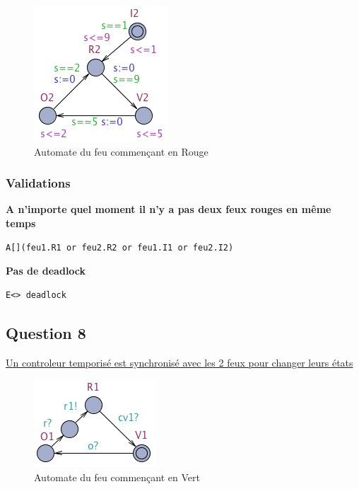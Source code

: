 \documentclass[11pt]{article}
\begin{document}
\begin{figure}[H]
	\centering
	\includegraphics{ressources/part2/Q7-2.png}
	\caption{Automate du feu commençant en Rouge}
\end{figure}

\subsubsection{Validations}

\textbf{A n'importe quel moment il n'y a pas deux feux rouges en même temps}
\begin{verbatim}
A[](feu1.R1 or feu2.R2 or feu1.I1 or feu2.I2)
\end{verbatim}

\textbf{Pas de deadlock}
\begin{verbatim}
E<> deadlock
\end{verbatim}

\subsection{Question 8}

\href{https://github.com/masters-info-nantes/hong-cheng-lv/blob/master/ressources/part2/Q8-ControleurTemporiseEtSynchro.xml}{Un controleur temporisé est synchronisé avec les 2 feux pour changer leurs
états}

\begin{figure}[H]
	\centering
	\includegraphics{ressources/part2/Q8-1.png}
	\caption{Automate du feu commençant en Vert}
\end{figure}
\end{document}
